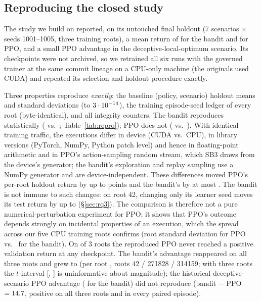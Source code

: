 \subsection{Reproducing the closed study}
\label{sec:repro}

The study we build on reported, on its untouched final holdout (7 scenarios
$\times$ seeds 1001--1005, three training roots), a mean return of
\HistBandit{} for the bandit and \HistPPO{} for PPO, and a small PPO advantage
in the deceptive-local-optimum scenario. Its checkpoints were not archived,
so we retrained all six runs with the governed trainer at the same commit
lineage on a CPU-only machine (the originals used CUDA) and repeated its
selection and holdout procedure exactly.

Three properties reproduce \emph{exactly}: the \BaselineReproCells{} baseline (policy,
scenario) holdout means and standard deviations (to $3\cdot10^{-14}$), the
training episode-seed ledger of every root (byte-identical), and all integrity
counters. The bandit reproduces statistically (\ReproBandit{} vs.\
\HistBandit{}; Table~\ref{tab:repro}); PPO does not (\ReproPPO{} vs.\
\HistPPO{}). With identical training traffic, the executions differ in device
(CUDA vs.\ CPU), in library versions (PyTorch, NumPy, Python patch level) and
hence in floating-point arithmetic and in PPO's action-sampling random stream,
which SB3 draws from the device's generator; the bandit's exploration and
replay sampling use a NumPy generator and are device-independent. These
differences moved PPO's per-root holdout return by up to \ReproMaxShiftPPO{}
points and the bandit's by at most \ReproMaxShiftBandit{}. The bandit is not
immune to such changes: on root 42, changing only its learner seed moves its
test return by up to \NoiseBanditSpread{} (\S\ref{sec:rq3}). The comparison is
therefore not a pure numerical-perturbation experiment for PPO; it shows that
PPO's outcome depends strongly on incidental properties of an execution, which
the spread across our five CPU training roots confirms (root standard
deviation \TestPPORootSd{} for PPO vs.\ \TestBanditRootSd{} for the
bandit). On
\ReproPPONeverPositive{} of 3 roots the reproduced PPO never reached a positive
validation return at any checkpoint. The bandit's advantage reappeared on all
three roots and grew to \ReproGap{} (per root \ReproGapPerRoot{}, roots 42 /
271828 / 314159; with three roots the $t$-interval [\ReproGapTLo,
\ReproGapTHi] is uninformative about magnitude); the historical deceptive-scenario PPO advantage
(\HistDeceptive{} for the bandit) did not reproduce (bandit $-$ PPO
$=14.7{}$, positive on all three roots and in every paired
episode).

